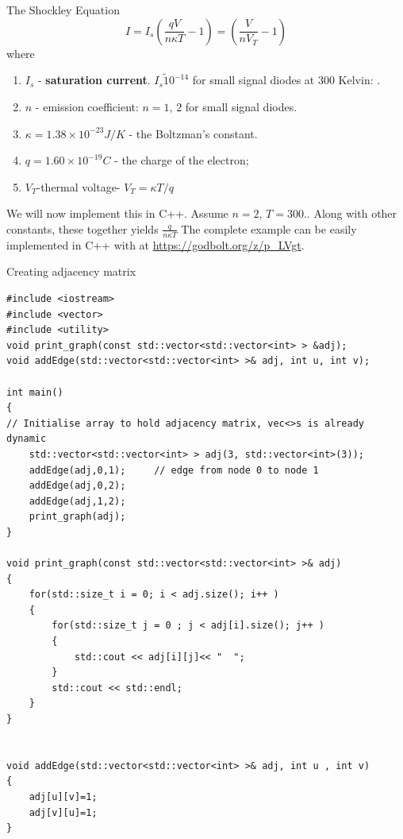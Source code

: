 \documentclass[xcolor=dvipsnames]{beamer}
\begin{document}
\begin{frame}{The Shockley Equation}
\[I=I_s\left(\frac{qV}{n\kappa T}-1\right)=\left(\frac{V}{nV_T}-1\right)\]
where
\begin{enumerate}
    \item $I_s$ - \textbf{saturation current}. $I_s\tilde 10^{-14}$ for small signal diodes at $300$ Kelvin: .
    \item $n$ - emission coefficient: $n=1,\,2$ for small signal diodes.
    \item $\kappa=1.38\times 10^{-23} J/K$ - the Boltzman's constant.
    \item $q=1.60\times 10^{-19}C$ - the charge of the electron;
    \item $V_T$-thermal voltage- $V_T=\kappa T/q$
\end{enumerate}
We will now implement this in C++. Assume $n=2$, $T=300.$. Along with other constants, these together yields $\frac{q}{n\kappa T}$ The complete example can be easily implemented in C++ with  \href{http://eigen.tuxfamily.org/index.php?title=Main_Page}{}
at \url{https://godbolt.org/z/p_LVgt}.
\end{frame}

\begin{frame}[fragile,shrink=5]{Creating adjacency matrix}
\begin{verbatim}
#include <iostream>
#include <vector>
#include <utility>
void print_graph(const std::vector<std::vector<int> > &adj);
void addEdge(std::vector<std::vector<int> >& adj, int u, int v);

int main()
{
// Initialise array to hold adjacency matrix, vec<>s is already dynamic
    std::vector<std::vector<int> > adj(3, std::vector<int>(3));
    addEdge(adj,0,1);     // edge from node 0 to node 1
    addEdge(adj,0,2);
    addEdge(adj,1,2);
    print_graph(adj);
}

void print_graph(const std::vector<std::vector<int> >& adj)
{
    for(std::size_t i = 0; i < adj.size(); i++ )
    {
        for(std::size_t j = 0 ; j < adj[i].size(); j++ )
        {
            std::cout << adj[i][j]<< "  ";
        }
        std::cout << std::endl;
    }
}


void addEdge(std::vector<std::vector<int> >& adj, int u , int v)
{
    adj[u][v]=1;
    adj[v][u]=1;
}

\end{verbatim}	
\end{frame}
\end{document}
